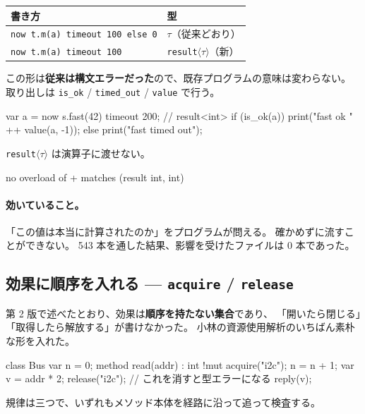 \documentclass[11pt,a4paper]{ltjsarticle}
\theoremstyle{definition}
\theoremstyle{remark}
\begin{document}
\begin{center}
\begin{tabular}{ll}
\toprule
書き方 & 型 \\
\midrule
\texttt{now t.m(a) timeout 100 else 0} & $\tau$（従来どおり） \\
\texttt{now t.m(a) timeout 100}        & \texttt{result}$\langle\tau\rangle$（新） \\
\bottomrule
\end{tabular}
\end{center}

この形は\textbf{従来は構文エラーだった}ので、既存プログラムの意味は変わらない。
取り出しは \texttt{is\_ok} / \texttt{timed\_out} / \texttt{value} で行う。

\begin{aipl}
var a = now s.fast(42) timeout 200;      // result<int>
if (is_ok(a)) { print("fast ok " ++ value(a, -1)); }
else          { print("fast timed out"); }
\end{aipl}

\texttt{result}$\langle\tau\rangle$ は演算子に渡せない。

\begin{term}
 no overload of + matches (result int, int)
\end{term}

\paragraph{効いていること。}
「この値は本当に計算されたのか」をプログラムが問える。
確かめずに流すことができない。
543 本を通した結果、影響を受けたファイルは 0 本であった。

\subsection{効果に順序を入れる --- \texttt{acquire} / \texttt{release}}
\label{sec:res}

第 2 版で述べたとおり、効果は\textbf{順序を持たない集合}であり、
「開いたら閉じる」「取得したら解放する」が書けなかった。
小林の資源使用解析のいちばん素朴な形を入れた。

\begin{aipl}
class Bus {
  var n = 0;
  method read(addr) : int !{mut} {
    acquire("i2c");
    n = n + 1;
    var v = addr * 2;
    release("i2c");           // これを消すと型エラーになる
    reply(v);
  }
}
\end{aipl}

規律は三つで、いずれもメソッド本体を経路に沿って追って検査する。
\end{document}
